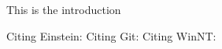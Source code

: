 This is the introduction

Citing Einstein: \cite{einstein}
Citing Git: \cite{Git5}
Citing WinNT: \cite{WinNT}

